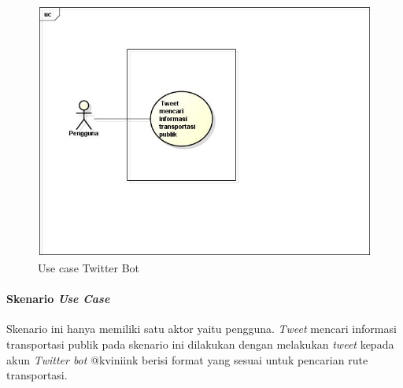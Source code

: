 \begin{figure}[htbp]
	\centering
		\includegraphics{Gambar/usecase.jpg}
	\caption{Use case Twitter Bot}
	\label{fig:usecase}
\end{figure}

\paragraph{Skenario \textit{Use Case}}
Skenario ini hanya memiliki satu aktor yaitu pengguna. \textit{Tweet} mencari informasi transportasi publik pada skenario ini dilakukan dengan melakukan \textit{tweet} kepada akun \textit{Twitter bot} @kviniink berisi format yang sesuai untuk pencarian rute transportasi. 

